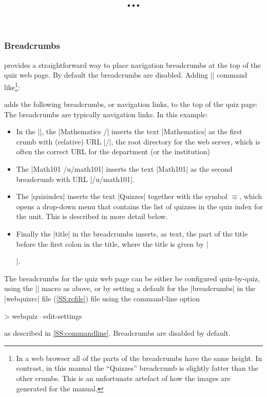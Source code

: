 \documentclass[svgnames]{article}
\makeatletter
\newcommand\macroIndex[1]{%
  \lowercase{\def\temp{#1}}%
  \expandafter\index\expandafter{\temp@\textbackslash#1}%
}
\newcommand\webquizrc{\index{webquizrc}%
  \BashCode|webquizrc| file (\autoref{SS:rcfile})\xspace%
}
\makeatother
\begin{document}
    \subsubsection{Breadcrumbs}\label{SS:breadcrumbs}
    \WebQuiz provides a straightforward way to place navigation breadcrumbs
    at the top of the quiz web page. By default the
    breadcrumbs are disabled. Adding \LatexCode|\BreadCrumbs| command
    like\footnote{In a web browser all of the parts of the breadcrumbs
    have the same height. In contrast, in this manual the ``Quizzes''
    breadcrumb is slightly fatter than the other crumbs. This is an
    unfortunate artefact of how the images are generated for the
    manual.}:
    \begin{latexcode}
    \end{latexcode}
    adds the following breadcrumbs, or navigation links, to the top of
    the quiz page:
    The breadcrumbs are typically navigation links. In this example:
    \begin{itemize}
      \item In the \LatexCode|\BreadCrumbs|, the \BashCode|Mathematics /| inserts the text
      \BashCode|Mathematics| as the first crumb with (relative) URL
      \BashCode|/|, the root directory for the web
      server, which is often the correct URL for the department (or the
      institution)
      \item The \BashCode|Math101 /u/math101| inserts the text
      \BashCode|Math101| as the second breadcrumb with URL
      \BashCode|/u/math101|.
      \item The \BashCode|quizindex| inserts the text \BashCode|Quizzes|
      together with the symbol $\equiv$, which opens a drop-down menu
      that contains the list of quizzes in the quiz index for the unit.
      This is described in more detail below.
      \item Finally the \LatexCode|title| in the breadcrumbs inserts, as
      text, the part of the title before the first colon in the title,
      where the title is given by \LatexCode|\title{...}|.
    \end{itemize}
    The breadcrumbs for the quiz web page can be either be configured
    quiz-by-quiz, using the \LatexCode|\BreadCrumbs| macro
    \macroIndex{BreadCrumbs} as above, or by setting a default for the
    \LatexCode|breadcrumbs|  in the \webquizrc file using the
    command-line option
    \begin{bashcode}
      > webquiz --edit-settings
    \end{bashcode}
    as described in \autoref{SS:commandline}. Breadcrumbs are disabled by default.
\end{document}

